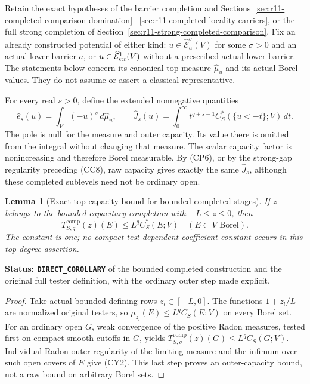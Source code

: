 \documentclass[11pt,a4paper]{article}
\numberwithin{equation}{section}
\newtheorem{lemma}[theorem]{Lemma}
\theoremstyle{definition}
\theoremstyle{remark}
\begin{document}
Retain the exact hypotheses of the barrier completion and
Sections~\ref{sec:r11-completed-comparison-domination}--
\ref{sec:r11-completed-locality-carriers}, or the full strong
completion of Section~\ref{sec:r11-strong-completed-comparison}.
Fix an already constructed potential of either kind:
$u\in\widehat{\mathcal E}^{\sigma}_a(V)$ for some $\sigma>0$
and an actual lower barrier $a$, or
$u\in\widehat{\mathcal E}^1_{\rm str}(V)$ without a prescribed
actual lower barrier. The statements below concern its canonical top measure
$\widehat\mu_u$ and its actual Borel values. They do not assume
or assert a classical representative.

For every real $s>0$, define the extended nonnegative quantities
\[
 \widehat e_s(u)=\int_V(-u)^s\,d\widehat\mu_u,
 \qquad
 \widehat J_s(u)=\int_0^\infty
                   t^{q+s-1}C_S^*(\{u<-t\};V)\,dt.
 \tag{CY1}
\]
The pole is null for the measure and outer capacity. Its value
there is omitted from the integral without changing that
measure. The scalar capacity factor is nonincreasing and
therefore Borel measurable. By (CP6), or by the strong-gap
regularity preceding (CC8), raw capacity gives
exactly the same $\widehat J_s$, although these completed
sublevels need not be ordinary open.

\begin{lemma}[Exact top capacity bound for bounded completed stages]
\label{lem:r11-completed-bounded-top-capacity}
If $z$ belongs to the bounded capacitary completion with
$-L\leq z\leq0$, then
\[
                    T^{\mathrm{comp}}_{S,q}(z)(E)
                                  \leq L^q C_S^*(E;V)
                      \quad(E\subset V\text{ Borel}).
 \tag{CY2}
\]
The constant is one; no compact-test dependent coefficient
constant occurs in this top-degree assertion.
\end{lemma}

\noindent\textbf{Status: \texttt{DIRECT\_COROLLARY}} of the
bounded completed construction and the original full tester
definition, with the ordinary outer step made explicit.

\begin{proof}
Take actual bounded defining rows $z_l\in[-L,0]$.
The functions $1+z_l/L$ are normalized original testers, so
$\mu_{z_l}(E)\leq L^q C_S(E;V)$ on every Borel set.
For an ordinary open $G$, weak convergence of the positive
Radon measures, tested first on compact smooth cutoffs in
$G$, yields
$T^{\mathrm{comp}}_{S,q}(z)(G)\leq L^q C_S(G;V)$.
Individual Radon outer regularity of the limiting measure and
the infimum over such open covers of $E$ give (CY2).
This last step proves an outer-capacity bound, not a raw
bound on arbitrary Borel sets.
\end{proof}
\end{document}
